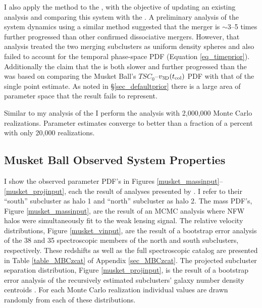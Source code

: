 I also apply the method to the , with the objective of updating an existing analysis and comparing this system with the .  
A preliminary analysis of the system dynamics using a similar method \citep{Dawson:2012dl} suggested that the  merger is $\sim$3--5 times further progressed than other confirmed dissociative mergers.
However, that analysis treated the two merging subclusters as uniform density spheres   and also failed to account for the temporal phase-space PDF (Equation \ref{eq_timeprior}).
Additionally the claim that the  is both slower and further progressed than the  was based on comparing the Musket Ball's $TSC_0$--$v_{\rm 3D}(t_{\rm col})$ PDF with that of the single point \citet{Springel:2007bg} estimate.
As noted in \S\ref{sec_defaultprior} there is a large area of parameter space that the \citet{Springel:2007bg} result fails to represent.

Similar to my analysis of the  I perform the analysis with 2,000,000 Monte Carlo realizations.
Parameter estimates converge to better than a fraction of a percent with only 20,000 realizations.

\subsection{Musket Ball Observed System Properties}

I show the observed  parameter PDF's in Figures \ref{musket_massinput}--\ref{musket_projinput}, each the result of analyses presented by \citet{Dawson:2012dl}.  
I refer to their ``south'' subcluster as halo 1 and ``north'' subcluster as halo 2. 
The mass PDF's, Figure \ref{musket_massinput}, are the result of an MCMC analysis where NFW halos were simultaneously fit to the weak lensing signal.
The relative velocity distributions, Figure \ref{musket_vinput}, are the result of a bootstrap error analysis \citep{Beers:1990kg} of the 38 and 35 spectroscopic members of the north and south subclusters, respectively.
These redshifts as well as the full  spectroscopic catalog are presented in Table \ref{table_MBCzcat} of Appendix \ref{sec_MBCzcat}.
The projected subcluster separation distribution, Figure \ref{musket_projinput}, is the result of a bootstrap error analysis of the recursively estimated subclusters' galaxy number density centroids \citep[see e.g.][for a description of this method]{Randall:2008hs}.
For each Monte Carlo realization individual values are drawn randomly from each of these distributions. 

